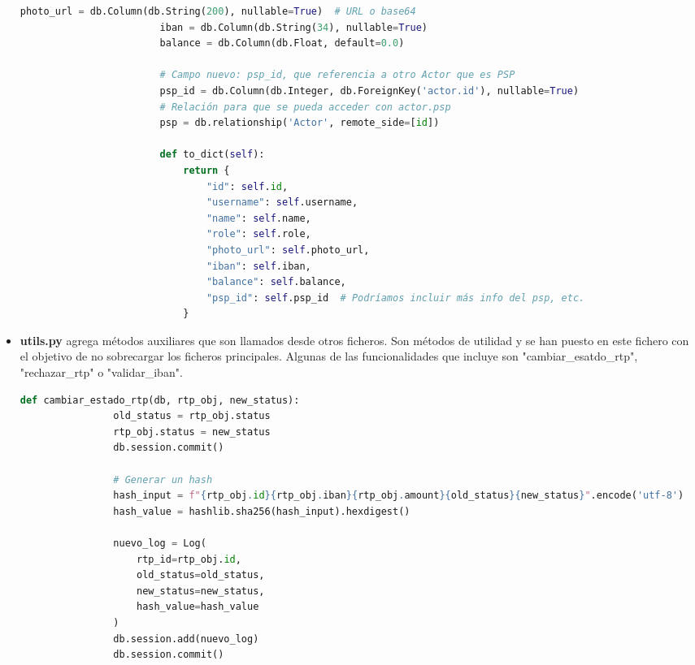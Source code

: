 \begin{itemize}
\begin{lstlisting}[language=Python, style=custom, caption={Modelo ORM + clase Actor}]
                        photo_url = db.Column(db.String(200), nullable=True)  # URL o base64
                        iban = db.Column(db.String(34), nullable=True)
                        balance = db.Column(db.Float, default=0.0)

                        # Campo nuevo: psp_id, que referencia a otro Actor que es PSP
                        psp_id = db.Column(db.Integer, db.ForeignKey('actor.id'), nullable=True)
                        # Relación para que se pueda acceder con actor.psp
                        psp = db.relationship('Actor', remote_side=[id])

                        def to_dict(self):
                            return {
                                "id": self.id,
                                "username": self.username,
                                "name": self.name,
                                "role": self.role,
                                "photo_url": self.photo_url,
                                "iban": self.iban,
                                "balance": self.balance,
                                "psp_id": self.psp_id  # Podríamos incluir más info del psp, etc.
                            }

                \end{lstlisting}

    \item \textbf{utils.py} agrega métodos auxiliares que son llamados desde otros ficheros. Son métodos de utilidad y se han puesto en este fichero con el objetivo de no sobrecargar los ficheros principales. Algunas de las funcionalidades que incluye son "cambiar\_esatdo_rtp", "rechazar\_rtp" o "validar\_iban".

            \begin{lstlisting}[language=Python, style=custom, caption={Funciones utilitarias}]
                def cambiar_estado_rtp(db, rtp_obj, new_status):
                old_status = rtp_obj.status
                rtp_obj.status = new_status
                db.session.commit()

                # Generar un hash
                hash_input = f"{rtp_obj.id}{rtp_obj.iban}{rtp_obj.amount}{old_status}{new_status}".encode('utf-8')
                hash_value = hashlib.sha256(hash_input).hexdigest()

                nuevo_log = Log(
                    rtp_id=rtp_obj.id,
                    old_status=old_status,
                    new_status=new_status,
                    hash_value=hash_value
                )
                db.session.add(nuevo_log)
                db.session.commit()


\end{lstlisting}
\end{itemize}
